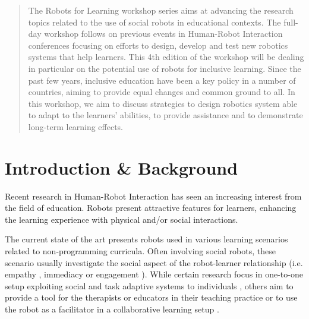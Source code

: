 \documentclass{sig-alternate-05-2015}
\begin{document}
\maketitle
\begin{abstract}
The Robots for Learning workshop series aims at advancing the research topics related to the use of social robots in educational contexts. 
The full-day workshop follows on previous events in Human-Robot Interaction conferences focusing on efforts to design, develop and test new robotics systems that help learners. 
This 4th edition of the workshop will be dealing in particular on the potential use of robots for inclusive learning.
Since the past few years, inclusive education have been a key policy in a number of countries, aiming to provide equal changes and common ground to all. 
In this workshop, we aim to discuss strategies to design robotics system able to adapt to the learners' abilities, to provide assistance and to demonstrate long-term learning effects. 

\end{abstract}



%
%


\section{Introduction \& Background}
Recent research in Human-Robot Interaction has seen an increasing interest from the field of education.
Robots present attractive features for learners, enhancing the learning experience with physical and/or social interactions.

The current state of the art presents robots used in various learning scenarios related to non-programming curricula. 
Often involving social robots, these scenario usually investigate the social aspect of the robot-learner relationship (i.e. empathy \cite{leite2014empathic}, immediacy \cite{kennedy2016social} or engagement \cite{lemaignan2016,castellano2013towards}).
While certain research focus in one-to-one setup exploiting social and task adaptive systems to individuals \cite{park2017telling}, others aim to provide a tool for the therapists or educators in their teaching practice or to use the robot as a facilitator in a collaborative learning setup \cite{Ozgur:2017:CVH:2909824.3020247}. 
\end{document}
